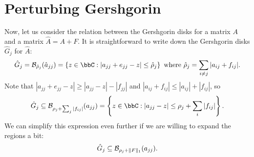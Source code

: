 \section{Perturbing Gershgorin}

Now, let us consider the relation between the Gershgorin disks for
a matrix $A$ and a matrix $\hat{A} = A+F$.  It is straightforward to write
down the Gershgorin disks $\hat{G}_j$ for $\hat{A}$:
\[
  \hat{G}_j = \calB_{\hat{\rho}_j}(\hat{a}_{jj}) =
  \left\{
    z \in \bbC : |a_{jj}+e_{jj}-z| \leq \hat{\rho}_j
  \right\}
    \mbox{ where }
    \hat{\rho}_j = \sum_{i \neq j} |a_{ij}+f_{ij}|.
\]
Note that $|a_{jj} + e_{jj} - z| \geq |a_{jj}-z|-|f_{jj}|$
and $|a_{ij}+f_{ij}| \leq |a_{ij}|+|f_{ij}|$, so
\begin{equation} \label{disk-bound-1}
  \hat{G}_j \subseteq \calB_{\rho_j + \sum_j |f_{ij}|}(a_{jj}) =
  \left\{
    z \in \bbC : |a_{jj}-z| \leq \rho_j + \sum_i |f_{ij}|
  \right\}.
\end{equation}
We can simplify this expression even further if we are willing
to expand the regions a bit:
\begin{equation} \label{disk-bound-2}
  \hat{G}_j \subseteq \mathcal{B}_{\rho_j + \|F\|_{1}}(a_{jj}).
\end{equation}
